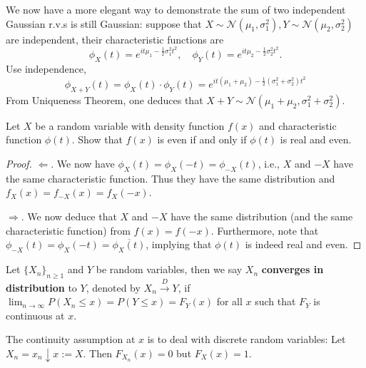 \documentclass[11pt,singlecolumn, openany, citestyle=authoryear]{elegantbook}
\begin{document}
\begin{CJK}{UTF8}{gbsn}
\begin{example}
    We now have a more elegant way to demonstrate the sum of two independent Gaussian
    r.v.s is still Gaussian: suppose that $X\sim \mathcal{N}(\mu_1,\sigma_1^2),
    Y\sim \mathcal{N}(\mu_2,\sigma_2^2)$ are independent, their characteristic functions 
    are 
    $$
    \phi_X(t)=e^{it\mu_1-\frac{1}{2}\sigma_1^2t^2},\quad 
    \phi_Y(t)=e^{it\mu_2-\frac{1}{2}\sigma_2^2t^2}.
    $$
    Use independence,
    $$
    \phi_{X+Y}(t)=\phi_X(t)\cdot \phi_Y(t)=e^{it(\mu_1+\mu_2)-\frac{1}{2}(\sigma_1^2+
    \sigma_2^2)t^2}
    $$
    From Uniqueness Theorem, one deduces that $X+Y \sim \mathcal{N}(\mu_1+\mu_2,\sigma_1^2+
    \sigma_2^2)$.
\end{example}
\begin{exercise}
    Let $X$ be a random variable with density function $f(x)$ and 
    characteristic function $\phi(t)$. Show that $f(x)$ is even if and only if 
    $\phi(t)$ is real and even.
\end{exercise}
\begin{proof}
    $\Longleftarrow$. We now have $\phi_X(t)=\phi_X(-t)=\phi_{-X}(t)$, i.e.,
    $X$ and $-X$ have the same characteristic function. Thus they have the same 
    distribution and $f_X(x)=f_{-X}(x)=f_X(-x)$.

    $\Longrightarrow$. We now deduce that $X$ and $-X$ have the same 
    distribution (and the same characteristic function) from $f(x)=f(-x)$. Furthermore,
    note that $\phi_{-X}(t)=\phi_{X}(-t)=\overline{\phi_X(t)}$, implying that $\phi(t)$
    is indeed real and even. 
\end{proof}

\begin{definition}
    Let $\{X_n\}_{n\geqslant 1}$ and $Y$ be random variables, then we say $X_n$ 
    \textbf{converges in distribution} to $Y$, denoted by $X_n \overset{D}{\longrightarrow}Y$,
    if $\displaystyle \lim_{n\to\infty} P(X_n\leqslant x)=P(Y\leqslant x)=F_Y(x)$ for all $x$ such that $F_Y$ is 
    continuous at $x$.
\end{definition}
\begin{remark}
    The continuity assumption at $x$ is to deal with discrete random variables:
    Let $X_n = x_n \downarrow x := X$. Then $F_{X_n}(x)=0$ but $F_X(x)=1$.
\end{remark}


\end{CJK}
\end{document}

